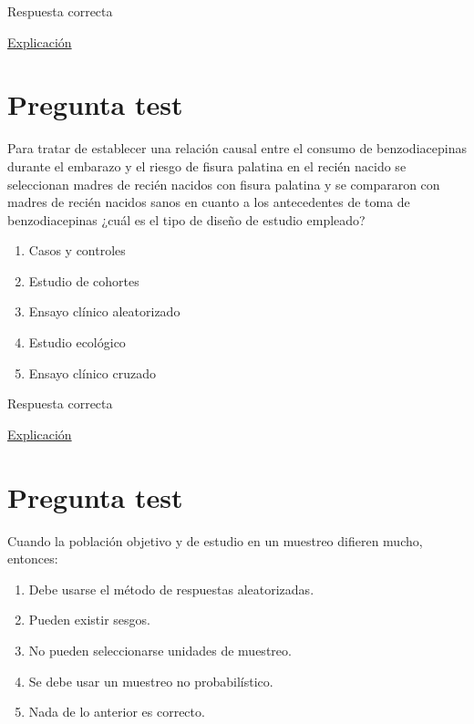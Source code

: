 \documentclass[
]{book}
\providecommand{\tightlist}{%
  \setlength{\itemsep}{0pt}\setlength{\parskip}{0pt}}
\begin{document}
Respuesta correcta

\href{http://www.scielo.org.pe/scielo.php?script=sci_arttext\&pid=S2308-05312020000100138}{Explicación}

\hypertarget{pregunta-test-45}{%
\section{Pregunta test}\label{pregunta-test-45}}

Para tratar de establecer una relación causal entre el consumo de benzodiacepinas durante el embarazo y el riesgo de fisura palatina en el recién nacido se seleccionan madres de recién nacidos con fisura palatina y se compararon con madres de recién nacidos sanos en cuanto a los antecedentes de toma de benzodiacepinas ¿cuál es el tipo de diseño de estudio empleado?

\begin{enumerate}
\def\labelenumi{\alph{enumi})}
\tightlist
\item
  Casos y controles
\item
  Estudio de cohortes
\item
  Ensayo clínico aleatorizado
\item
  Estudio ecológico
\item
  Ensayo clínico cruzado
\end{enumerate}

Respuesta correcta

\href{http://www.scielo.org.pe/scielo.php?script=sci_arttext\&pid=S2308-05312020000100138}{Explicación}

\hypertarget{pregunta-test-46}{%
\section{Pregunta test}\label{pregunta-test-46}}

Cuando la población objetivo y de estudio en un muestreo difieren mucho, entonces:

\begin{enumerate}
\def\labelenumi{\alph{enumi})}
\tightlist
\item
  Debe usarse el método de respuestas aleatorizadas.
\item
  Pueden existir sesgos.
\item
  No pueden seleccionarse unidades de muestreo.
\item
  Se debe usar un muestreo no probabilístico.
\item
  Nada de lo anterior es correcto.
\end{enumerate}
\end{document}
